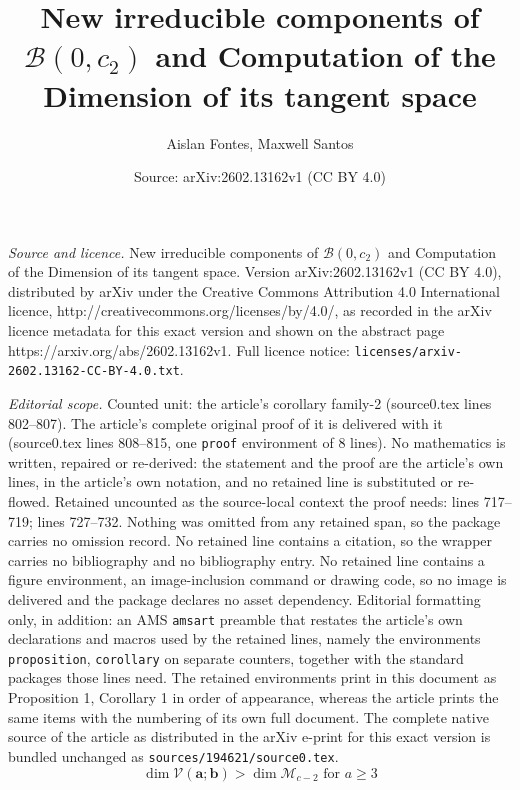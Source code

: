 \documentclass[10pt,a4paper]{amsart}
\title{New irreducible components of $\mathcal{B}(0,c_2)$ and Computation of the Dimension of its tangent space}
\author{Aislan Fontes, Maxwell Santos}
\date{Source: arXiv:2602.13162v1 (CC BY 4.0)}
\begin{document}
\maketitle

\noindent\emph{Source and licence.} New irreducible components of $\mathcal{B}(0,c_2)$ and Computation of the Dimension of its tangent space. Version arXiv:2602.13162v1 (CC BY 4.0), distributed by arXiv under the Creative Commons Attribution 4.0 International licence, http://creativecommons.org/licenses/by/4.0/, as recorded in the arXiv licence metadata for this exact version and shown on the abstract page https://arxiv.org/abs/2602.13162v1. Full licence notice: \texttt{licenses/arxiv-2602.13162-CC-BY-4.0.txt}.\par\smallskip

\noindent\textit{Editorial scope.} Counted unit: the article's corollary family-2 (source0.tex lines 802--807). The article's complete original proof of it is delivered with it (source0.tex lines 808--815, one \texttt{proof} environment of 8 lines). No mathematics is written, repaired or re-derived: the statement and the proof are the article's own lines, in the article's own notation, and no retained line is substituted or re-flowed.  Retained uncounted as the source-local context the proof needs: lines 717--719; lines 727--732.  Nothing was omitted from any retained span, so the package carries no omission record.  No retained line contains a citation, so the wrapper carries no bibliography and no bibliography entry.  No retained line contains a figure environment, an image-inclusion command or drawing code, so no image is delivered and the package declares no asset dependency.  Editorial formatting only, in addition: an AMS \texttt{amsart} preamble that restates the article's own declarations and macros used by the retained lines, namely the environments \texttt{proposition}, \texttt{corollary} on separate counters, together with the standard packages those lines need.  The retained environments print in this document as Proposition 1, Corollary 1 in order of appearance, whereas the article prints the same items with the numbering of its own full document.  The complete native source of the article as distributed in the arXiv e-print for this exact version is bundled unchanged as \texttt{sources/194621/source0.tex}.
\begin{equation}\label{dim-4}
\dim\mathcal{V}(\boldsymbol{a};\boldsymbol{b})>\dim\mathcal{M}_{c-2} \mbox{ for } a\geq3    
\end{equation}
\end{document}
